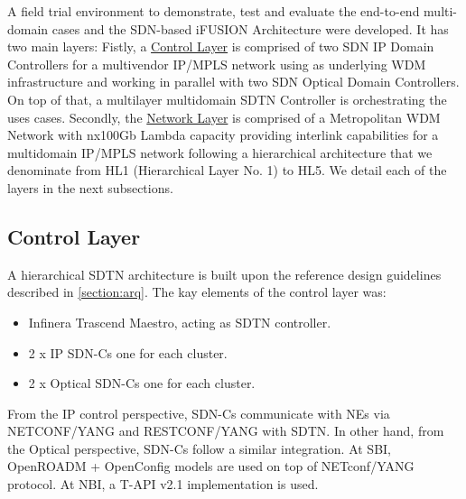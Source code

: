 \documentclass[a4paper,fleqn]{cas-dc}
\begin{document}
A field trial environment to demonstrate, test and evaluate the end-to-end multi-domain cases and the SDN-based i\uppercase{FUSION} Architecture were developed. It has two main layers: Fistly, a \hyperref[sec:contol_lay]{Control Layer} is comprised of two SDN IP Domain Controllers for a multivendor IP/MPLS network using as underlying WDM infrastructure and working in parallel with two SDN Optical Domain Controllers. On top of that, a multilayer multidomain SDTN Controller is orchestrating the uses cases. Secondly, the \hyperref[sec:net_lay]{Network Layer} is comprised of a Metropolitan WDM Network with nx100Gb Lambda capacity providing interlink capabilities for a multidomain IP/MPLS network following a hierarchical architecture that we denominate from HL1 (Hierarchical Layer No. 1) to HL5. We detail each of the layers in the next subsections. 

\subsection{Control Layer}
\label{sec:contol_lay}
A hierarchical SDTN architecture is built upon the reference design guidelines described in \cref{section:arq}. The kay elements of the control layer was:
\begin{itemize}
    \item Infinera Trascend Maestro, acting as SDTN controller.
    \item 2 x IP SDN-Cs one for each cluster.
    \item 2 x Optical SDN-Cs one for each cluster.
\end{itemize}

From the IP control perspective, SDN-Cs communicate with NEs via NETCONF/YANG and RESTCONF/YANG with SDTN.  In other hand, from the Optical perspective, SDN-Cs follow a similar integration. At SBI, OpenROADM + OpenConfig models are used on top of NETconf/YANG protocol. At NBI, a T-API v2.1 implementation is used.  
\end{document}
